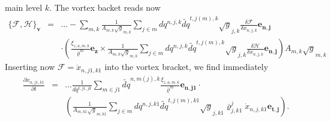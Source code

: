 main level $k$. The vortex backet reads now
\begin{eqnarray}
 \{\mathcal{F},\mathcal{H}\}_{\mathbf{v}}&=&...-\sum_{m,k}
\frac{1}{A_{m,k}\sqrt{g}_{m,k}}\sum_{j\in m} dq^{n,j,k}\widetilde{dq}^{t,j(m),k}
\sqrt{g}_{j,k}\frac{\delta\mathcal{F}}{\delta\dot{x}_{n,j,k}}\mathbf{e_{n,j}}
\label{vert_bracket}
\\&&
\cdot\left(\frac{\xi_{z,a,m,k}}{\overline{\varrho}^m}\mathbf{e_z}\times
\frac{1}{A_{m,k}\sqrt{g}_{m,k}}\sum_{j\in m} dq^{n,j,k}\widetilde{dq}^{t,j(m),k}
\sqrt{g}_{j,k}\frac{\delta\mathcal{H}}{\delta\dot{x}_{n,j,k}}\mathbf{e_{n,j}}
\right){A_{m,k}\sqrt{g}_{m,k}}\nonumber
\end{eqnarray}
Inserting now $\mathcal{F}=\dot{x}_{n,j1,k1}$ into the vortex bracket, we find
immediately
\begin{eqnarray*}
 \frac{\partial \dot{x}_{n,j1,k1}}{\partial t}&=&...
\frac{1}{dq^{t,j1,jk}}\sum_{m\in j1}\widetilde{dq}^{n,m(j),k}
\frac{\xi_{z,a,m,k}}{\overline{\varrho}^m}
\mathbf{e_{n,j1}}\cdot\\&&
\left(
\frac{1}{A_{m,k1}\sqrt{g}_{m,k1}}\sum_{j\in m} dq^{n,j,k1}\widetilde{dq}^{t,j(m),k1}
\sqrt{g}_{j,k1}\overline{\varrho}^j_{j,k1}\dot{x}_{n,j,k1}\mathbf{e_{t,j}}
\right).
\end{eqnarray*}

